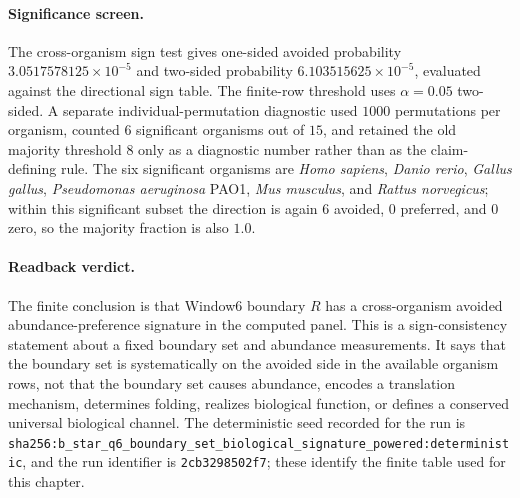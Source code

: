 \paragraph{Significance screen.}
The cross-organism sign test gives one-sided avoided probability $3.0517578125\times 10^{-5}$ and two-sided probability $6.103515625\times 10^{-5}$, evaluated against the directional sign table.  The finite-row threshold uses $\alpha=0.05$ two-sided.  A separate individual-permutation diagnostic used $1000$ permutations per organism, counted $6$ significant organisms out of $15$, and retained the old majority threshold $8$ only as a diagnostic number rather than as the claim-defining rule.  The six significant organisms are \emph{Homo sapiens}, \emph{Danio rerio}, \emph{Gallus gallus}, \emph{Pseudomonas aeruginosa} PAO1, \emph{Mus musculus}, and \emph{Rattus norvegicus}; within this significant subset the direction is again $6$ avoided, $0$ preferred, and $0$ zero, so the majority fraction is also $1.0$.

\paragraph{Readback verdict.}
The finite conclusion is that Window6 boundary $R$ has a cross-organism avoided abundance-preference signature in the computed panel.  This is a sign-consistency statement about a fixed boundary set and abundance measurements.  It says that the boundary set is systematically on the avoided side in the available organism rows, not that the boundary set causes abundance, encodes a translation mechanism, determines folding, realizes biological function, or defines a conserved universal biological channel.  The deterministic seed recorded for the run is \texttt{sha256:b\_star\_q6\_boundary\_set\_biological\_signature\_powered:deterministic}, and the run identifier is \texttt{2cb3298502f7}; these identify the finite table used for this chapter.

